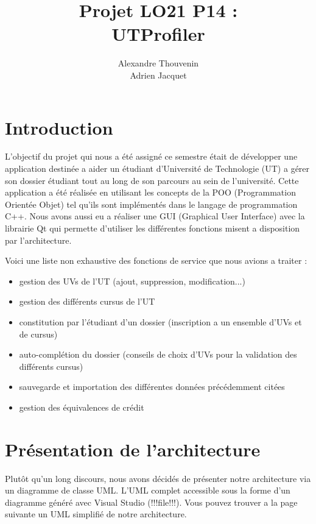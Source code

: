 \documentclass[a4paper,11pt]{article}
\title{Projet LO21 P14 :\\UTProfiler}
\author{Alexandre Thouvenin\\Adrien Jacquet}
\date{}
\begin{document}
\maketitle
\thispagestyle{empty}

\vspace{\fill}
\tableofcontents
\vspace{\fill}

\setlength{\parindent}{0mm}
\setlength{\parskip}{5mm}

\newpage
\section{Introduction}
L'objectif du projet qui nous a été assigné ce semestre était de développer une application destinée a aider un étudiant d'Université de Technologie (UT) a gérer son dossier étudiant tout au long de son parcours au sein de l'université. Cette application a été réalisée en utilisant les concepts de la POO (Programmation Orientée Objet) tel qu'ils sont implémentés dans le langage de programmation C++. Nous avons aussi eu a réaliser une GUI (Graphical User Interface) avec la librairie Qt qui permette d'utiliser les différentes fonctions misent a disposition par l'architecture.

Voici une liste non exhaustive des fonctions de service que nous avions a traiter :
\begin{itemize}[label=-]
	\item gestion des UVs de l'UT (ajout, suppression, modification...)
	\item gestion des différents cursus de l'UT
	\item constitution par l’étudiant d'un dossier (inscription a un ensemble d'UVs et de cursus)
	\item auto-complétion du dossier (conseils de choix d'UVs pour la validation des différents cursus)
	\item sauvegarde et importation des différentes données précédemment citées
	\item gestion des équivalences de crédit
\end{itemize}

\vspace{1cm}
\section{Présentation de l'architecture}
Plutôt qu'un long discours, nous avons décidés de présenter notre architecture via un diagramme de classe UML. L'UML complet accessible sous la forme d'un diagramme généré avec Visual Studio (!!!file!!!). Vous pouvez trouver a la page suivante un UML simplifié de notre architecture.
\end{document}
